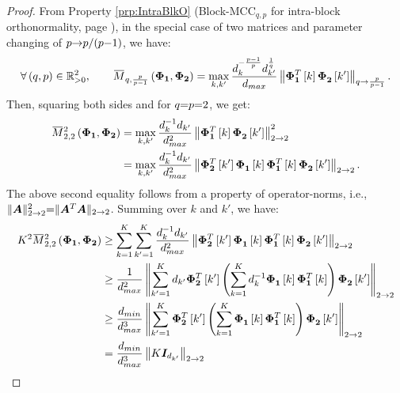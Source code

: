 \begin{proof}
From Property \ref{prp:IntraBlkO} (Block-MCC$_{q,p}$ for intra-block orthonormality, page \pageref{prp:IntraBlkO}), in the special case of two matrices and parameter changing of $p {\to} p/(p {-} 1)$, we have:
\begin{equation*}
\forall \myparanthese{q , p} \in \mathbb{R}^2_{>0}, \qquad
\overbar{M}_{q,\frac{p}{p-1}}\myparanthese{\myPhiOne , \myPhiTwo} = 
\max_{k,k'} \frac{d_k^{-\frac{p-1}{p}} d_{k'}^{\frac1q}}{d_{max}} \mynorm{\myPhiOne ^T \mybracket{k} \myPhiTwo^{ }\mybracket{k'}}_{q \to \frac{p}{p-1}}.
\end{equation*}
Then, squaring both sides and for $q {=} p {=} 2$, we get:
\begin{gather*}
\begin{aligned}
\overbar{M}^2_{2,2}\myparanthese{\myPhiOne , \myPhiTwo} &= 
\max_{k,k'} \frac{d_k^{-1} d_{k'}}{d^2_{max}}\mynorm{\myPhiOne^T \mybracket{k} \myPhiTwo^{ }\mybracket{k'}}^2_{2 \to 2}\\
&= \max_{k,k'} \frac{d_k^{-1} d_{k'}}{d^2_{max}}\mynorm{\myPhiTwo^T \mybracket{k'} \myPhiOne^{ } \mybracket{k} \myPhiOne^T \mybracket{k} \myPhiTwo^{ }\mybracket{k'}}_{2 \to 2}.
\end{aligned}
\end{gather*}
The above second equality follows from a property of operator-norms, 
i.e., $\Vert \boldsymbol{A} \Vert^2 _{2 \to 2} {=} \Vert \boldsymbol{A}^T \boldsymbol{A} \Vert _{2 \to 2}$.
Summing over $k$ and $k'$, we have:
\begin{gather*}
\begin{aligned}
K^2 \overbar{M}^2_{2,2}\myparanthese{\myPhiOne , \myPhiTwo} &\geq
\displaystyle\sum_{k=1}^K \displaystyle\sum_{k'=1}^K \frac{d_k^{-1} d_{k'}}{d^2_{max}} \mynorm{\myPhiTwo^T \mybracket{k'} \myPhiOne^{ } \mybracket{k} \myPhiOne^T \mybracket{k} \myPhiTwo^{ }\mybracket{k'}}_{2 \to 2} \\
&\geq \frac{1}{d^2_{max}} \mynorm{\displaystyle\sum_{k'=1}^K d_{k'} \myPhiTwo ^T \mybracket{k'}\myparanthese{\displaystyle\sum_{k=1}^K d_k^{-1} \myPhiOne^{ } \mybracket{k} \myPhiOne^T \mybracket{k}} \myPhiTwo^{ }\mybracket{k'}}_{2 \to 2}\\
&\mycolor{\geq \frac{d_{min}}{d^{3}_{max}} \mynorm{\displaystyle\sum_{k'=1}^K \myPhiTwo ^T \mybracket{k'}\myparanthese{\displaystyle\sum_{k=1}^K \myPhiOne^{ } \mybracket{k} \myPhiOne^T \mybracket{k}} \myPhiTwo^{ }\mybracket{k'}}_{2 \to 2}} \\
&= \frac{d_{min}}{d^{3}_{max}} \mynorm{K \boldsymbol{I}_{d_{k'}}}_{2 \to 2}\\

\end{aligned}
\end{gather*}
\end{proof}
